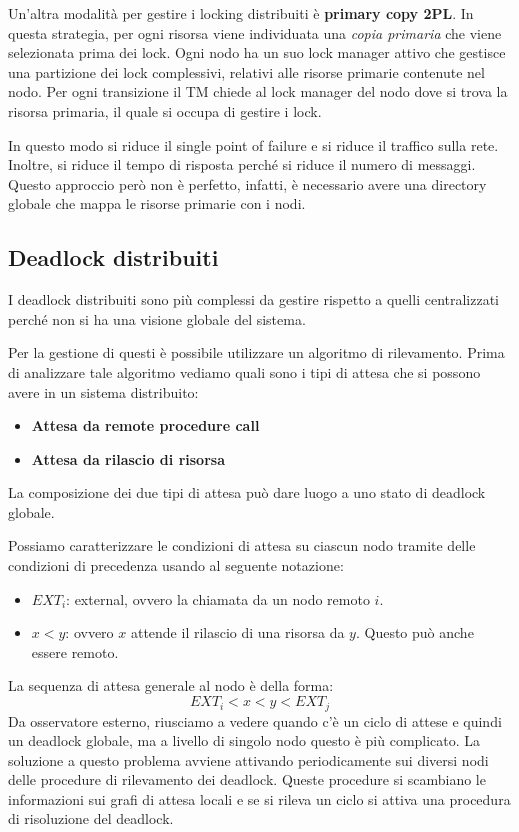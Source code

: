 Un'altra modalità per gestire i locking distribuiti è \textbf{primary copy 2PL}.
In questa strategia, per ogni risorsa viene individuata una \textit{copia primaria}
che viene selezionata prima dei lock. Ogni nodo ha un suo lock manager attivo che
gestisce una partizione dei lock complessivi, relativi alle risorse primarie
contenute nel nodo. Per ogni transizione il TM chiede al lock manager del nodo
dove si trova la risorsa primaria, il quale si occupa di gestire i lock.

In questo modo si riduce il single point of failure e si riduce il traffico
sulla rete. Inoltre, si riduce il tempo di risposta perché si riduce il numero
di messaggi. Questo approccio però non è perfetto, infatti, è necessario avere
una directory globale che mappa le risorse primarie con i nodi.
\subsection{Deadlock distribuiti}
I deadlock distribuiti sono più complessi da gestire rispetto a quelli centralizzati
perché non si ha una visione globale del sistema.

Per la gestione di questi è possibile utilizzare un algoritmo di rilevamento.
Prima di analizzare tale algoritmo vediamo quali sono i tipi di attesa che
si possono avere in un sistema distribuito:
\begin{itemize}
    \item \textbf{Attesa da remote procedure call}
    \item \textbf{Attesa da rilascio di risorsa}
\end{itemize}
La composizione dei due tipi di attesa può dare luogo a uno stato di deadlock
globale.

Possiamo caratterizzare le condizioni di attesa su ciascun nodo tramite delle
condizioni di precedenza usando al seguente notazione:
\begin{itemize}
    \item \textbf{$EXT_i$}: external, ovvero la chiamata da un nodo remoto $i$.
    \item $x < y$: ovvero $x$ attende il rilascio di una risorsa da $y$. Questo
          può anche essere remoto.
\end{itemize}
La sequenza di attesa generale al nodo è della forma:
\begin{equation*}
    EXT_i < x < y < EXT_j
\end{equation*}
Da osservatore esterno, riusciamo a vedere quando c'è un ciclo di attese e
quindi un deadlock globale, ma a livello di singolo nodo questo è più complicato.
La soluzione a questo problema avviene attivando periodicamente sui diversi nodi
delle procedure di rilevamento dei deadlock. Queste procedure si scambiano le
informazioni sui grafi di attesa locali e se si rileva un ciclo si attiva una
procedura di risoluzione del deadlock.

